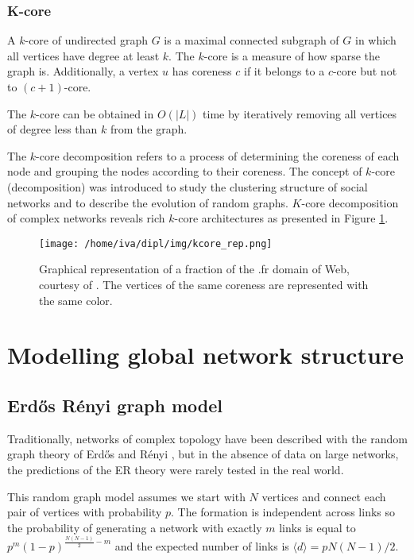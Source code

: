 \documentclass[times, utf8, diplomski]{fer}
\begin{document}
\subsubsection{K-core}
A $k$-core of undirected graph $G$ is a maximal connected subgraph of $G$ in which all vertices have degree at least $k$. The $k$-core is a measure of how sparse the graph is. 
Additionally, a vertex $u$ has coreness $c$ if it belongs to a $c$-core but not to  $(c+1)$-core. 

The $k$-core can be obtained in $O(|L|)$ time by iteratively removing all vertices of degree less than $k$ from the graph. 

 The $k$-core decomposition refers to a process of determining the coreness of each node and grouping the nodes according to their coreness. The concept of $k$-core (decomposition) was introduced to study the clustering structure of social networks and to describe the evolution of random graphs. $K$-core decomposition of complex networks reveals rich $k$-core architectures as presented in Figure \ref{kcore}. 

\begin{figure}
\texttt{[image: /home/iva/dipl/img/kcore\_rep.png]}
\caption{Graphical representation of a fraction of the .fr domain of Web, courtesy of \citet{Alvarez-hamelin_k-coredecomposition:}. The vertices of the same coreness are represented with the same color.}
\label{kcore}
\end{figure}

\section{Modelling global network structure}
\subsection{Erd{\H{o}}s R{\'{e}}nyi graph model}

Traditionally, networks of complex topology have been described with the random graph theory of Erd{\H{o}}s and R{\'{e}}nyi \cite{Erdos1959}, but in the absence of data on large networks, the predictions of the ER theory were rarely tested in the real world.

This random graph model assumes we start with $N$ vertices and connect each pair of vertices with probability $p$. The formation is independent across links so the probability of generating a network with exactly $m$ links is equal to $p^m(1 - p)^{\frac{N(N - 1)}{2} - m}$ and the expected number of links is $\langle d \rangle = pN(N - 1) / 2$. 
\end{document}

